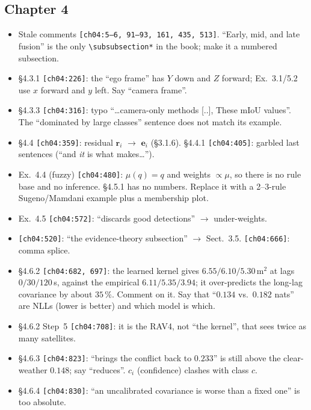 \documentclass[10pt,a4paper]{article}
\newcommand{\src}[1]{{\footnotesize\texttt{[#1]}}}
\begin{document}
\subsection*{Chapter 4}
\begin{itemize}
\item Stale comments \src{ch04:5--6, 91--93, 161, 435, 513}. ``Early, mid, and late fusion'' is the only \verb|\subsubsection*| in the book; make it a numbered subsection.
\item \S4.3.1 \src{ch04:226}: the ``ego frame'' has $Y$ down and $Z$ forward; Ex.~3.1/5.2 use $x$ forward and $y$ left. Say ``camera frame''.
\item \S4.3.3 \src{ch04:316}: typo ``\ldots camera-only methods [..], These mIoU values''. The ``dominated by large classes'' sentence does not match its example.
\item \S4.4 \src{ch04:359}: residual $\mathbf{r}_i$ $\to$ $\mathbf{e}_i$ (\S3.1.6). \S4.4.1 \src{ch04:405}: garbled last sentences (``and \emph{it} is what makes\ldots'').
\item Ex.~4.4 (fuzzy) \src{ch04:480}: $\mu(q)=q$ and weights $\propto\mu$, so there is no rule base and no inference. \S4.5.1 has no numbers. Replace it with a 2--3-rule Sugeno/Mamdani example plus a membership plot.
\item Ex.~4.5 \src{ch04:572}: ``discards good detections'' $\to$ under-weights.
\item \src{ch04:520}: ``the evidence-theory subsection'' $\to$ Sect.~3.5. \src{ch04:666}: comma splice.
\item \S4.6.2 \src{ch04:682, 697}: the learned kernel gives $6.55/6.10/5.30$\,m$^2$ at lags $0/30/120$\,s, against the empirical $6.11/5.35/3.94$; it over-predicts the long-lag covariance by about $35\,\%$. Comment on it. Say that ``$0.134$ vs.\ $0.182$ nats'' are NLLs (lower is better) and which model is which.
\item \S4.6.2 Step~5 \src{ch04:708}: it is the RAV4, not ``the kernel'', that sees twice as many satellites.
\item \S4.6.3 \src{ch04:823}: ``brings the conflict back to $0.233$'' is still above the clear-weather $0.148$; say ``reduces''. $c_i$ (confidence) clashes with class $c$.
\item \S4.6.4 \src{ch04:830}: ``an uncalibrated covariance is worse than a fixed one'' is too absolute.
\end{itemize}
\end{document}
